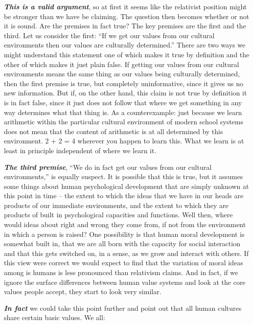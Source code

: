 \documentclass[]{book}
\begin{document}
\textbf{\emph{This is a valid argument}}, so at first it seems like the relativist position might be stronger than we have be claiming. The question then becomes whether or not it is sound. Are the premises in fact true? The key premises are the first and the third. Let us consider the first: ``If we get our values from our cultural environments then our values are culturally determined.'' There are two ways we might understand this statement one of which makes it true by definition and the other of which makes it just plain false. If getting our values from our cultural environments means the same thing as our values being culturally determined, then the first premise is true, but completely uninformative, since it gives us no new information. But if, on the other hand, this claim is not true by definition it is in fact false, since it just does not follow that where we get something in any way determines what that thing is. As a counterexample: just because we learn arithmetic within the particular cultural environment of modern school systems does not mean that the content of arithmetic is at all determined by this environment. 2 + 2 = 4 wherever you happen to learn this. What we learn is at least in principle independent of where we learn it.

\textbf{\emph{The third premise}}, ``We do in fact get our values from our cultural environments,'' is equally suspect. It is possible that this is true, but it assumes some things about human psychological development that are simply unknown at this point in time -- the extent to which the ideas that we have in our heads are products of our immediate environments, and the extent to which they are products of built in psychological capacities and functions. Well then, where would ideas about right and wrong they come from, if not from the environment in which a person is raised? One possibility is that human moral development is somewhat built in, that we are all born with the capacity for social interaction and that this gets switched on, in a sense, as we grow and interact with others. If this view were correct we would expect to find that the variation of moral ideas among is humans is less pronounced than relativism claims. And in fact, if we ignore the surface differences between human value systems and look at the core values people accept, they start to look very similar.

\textbf{\emph{In fact}} we could take this point further and point out that all human cultures share certain basic values. We all:
\end{document}
